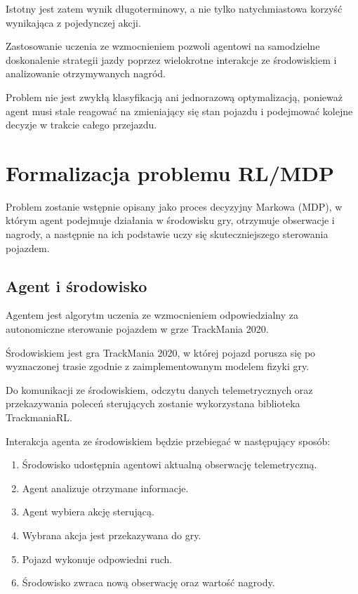 \documentclass[12pt]{article}
\begin{document}
Istotny jest zatem wynik długoterminowy, a nie tylko natychmiastowa korzyść wynikająca z pojedynczej akcji.

Zastosowanie uczenia ze wzmocnieniem pozwoli agentowi na samodzielne doskonalenie strategii jazdy poprzez wielokrotne interakcje ze środowiskiem i analizowanie otrzymywanych nagród.

Problem nie jest zwykłą klasyfikacją ani jednorazową optymalizacją, ponieważ agent musi stale reagować na zmieniający się stan pojazdu i podejmować kolejne decyzje w trakcie całego przejazdu.

\section{Formalizacja problemu RL/MDP}

Problem zostanie wstępnie opisany jako proces decyzyjny Markowa (MDP), w którym agent podejmuje działania w środowisku gry, otrzymuje obserwacje i nagrody, a następnie na ich podstawie uczy się skuteczniejszego sterowania pojazdem.

\subsection{Agent i środowisko}

Agentem jest algorytm uczenia ze wzmocnieniem odpowiedzialny za autonomiczne sterowanie pojazdem w grze TrackMania 2020.

Środowiskiem jest gra TrackMania 2020, w której pojazd porusza się po wyznaczonej trasie zgodnie z zaimplementowanym modelem fizyki gry.

Do komunikacji ze środowiskiem, odczytu danych telemetrycznych oraz przekazywania poleceń sterujących zostanie wykorzystana biblioteka TrackmaniaRL.

Interakcja agenta ze środowiskiem będzie przebiegać w następujący sposób:
\begin{enumerate}
    \item Środowisko udostępnia agentowi aktualną obserwację telemetryczną.
    \item Agent analizuje otrzymane informacje.
    \item Agent wybiera akcję sterującą.
    \item Wybrana akcja jest przekazywana do gry.
    \item Pojazd wykonuje odpowiedni ruch.
    \item Środowisko zwraca nową obserwację oraz wartość nagrody.
\end{enumerate}
\end{document}
